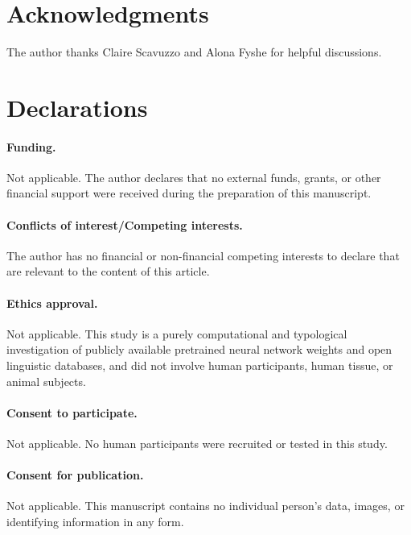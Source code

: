 \documentclass[11pt,a4paper]{article}
\begin{document}









\section*{Acknowledgments}
The author thanks Claire Scavuzzo and Alona Fyshe for helpful discussions.

\clearpage
\section*{Declarations}

\paragraph{Funding.}
Not applicable. The author declares that no external funds, grants, or other financial support were received during the preparation of this manuscript.

\paragraph{Conflicts of interest/Competing interests.}
The author has no financial or non-financial competing interests to declare that are relevant to the content of this article.

\paragraph{Ethics approval.}
Not applicable. This study is a purely computational and typological investigation of publicly available pretrained neural network weights and open linguistic databases, and did not involve human participants, human tissue, or animal subjects.

\paragraph{Consent to participate.}
Not applicable. No human participants were recruited or tested in this study.

\paragraph{Consent for publication.}
Not applicable. This manuscript contains no individual person's data, images, or identifying information in any form.
\end{document}
